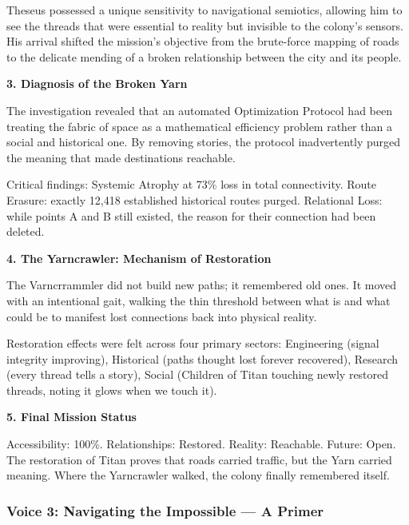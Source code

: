 \documentclass[11pt]{article}
\begin{document}
\begin{archivebox}
Theseus possessed a unique sensitivity to navigational semiotics, allowing him to see the threads that were essential to reality but invisible to the colony's sensors. His arrival shifted the mission's objective from the brute-force mapping of roads to the delicate mending of a broken relationship between the city and its people.

\textbf{3. Diagnosis of the Broken Yarn}

The investigation revealed that an automated Optimization Protocol had been treating the fabric of space as a mathematical efficiency problem rather than a social and historical one. By removing stories, the protocol inadvertently purged the meaning that made destinations reachable.

Critical findings: Systemic Atrophy at 73\% loss in total connectivity. Route Erasure: exactly 12,418 established historical routes purged. Relational Loss: while points A and B still existed, the reason for their connection had been deleted.

\textbf{4. The Yarncrawler: Mechanism of Restoration}

The Varncrrammler did not build new paths; it remembered old ones. It moved with an intentional gait, walking the thin threshold between what is and what could be to manifest lost connections back into physical reality.

Restoration effects were felt across four primary sectors: Engineering (signal integrity improving), Historical (paths thought lost forever recovered), Research (every thread tells a story), Social (Children of Titan touching newly restored threads, noting it glows when we touch it).

\textbf{5. Final Mission Status}

Accessibility: 100\%. Relationships: Restored. Reality: Reachable. Future: Open. The restoration of Titan proves that roads carried traffic, but the Yarn carried meaning. Where the Yarncrawler walked, the colony finally remembered itself.
\end{archivebox}

\subsubsection{Voice 3: Navigating the Impossible --- A Primer}
\end{document}
